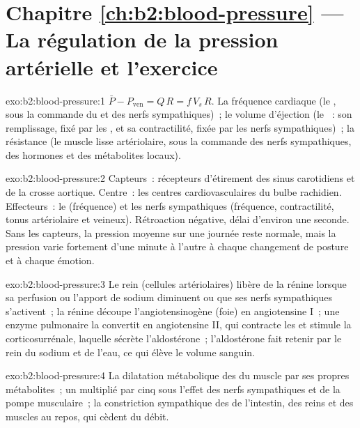 \section*{Chapitre \ref{ch:b2:blood-pressure} --- La régulation de la pression artérielle et l'exercice}

\begin{solution}{exo:b2:blood-pressure:1}
$\bar P - P_{\text{ven}} = Q\,R = f\,V_s\,R$. La fréquence cardiaque (le
, sous la commande du  et des nerfs
sympathiques)~; le volume d'éjection (le ~: son remplissage,
fixé par les , et sa contractilité, fixée par les nerfs
sympathiques)~; la résistance (le muscle lisse artériolaire, sous la
commande des nerfs sympathiques, des hormones et des métabolites
locaux).
\end{solution}

\begin{solution}{exo:b2:blood-pressure:2}
Capteurs~: récepteurs d'étirement des sinus carotidiens et de la crosse
aortique. Centre~: les centres cardiovasculaires du bulbe rachidien.
Effecteurs~: le  (fréquence) et les nerfs sympathiques
(fréquence, contractilité, tonus artériolaire et veineux). Rétroaction
négative, délai d'environ une seconde. Sans les capteurs, la pression
moyenne sur une journée reste normale, mais la pression varie
fortement d'une minute à l'autre à chaque changement de posture et à
chaque émotion.
\end{solution}

\begin{solution}{exo:b2:blood-pressure:3}
Le rein (cellules artériolaires) libère de la rénine lorsque sa
perfusion ou l'apport de sodium diminuent ou que ses nerfs sympathiques
s'activent~; la rénine découpe l'angiotensinogène (foie) en
angiotensine I~; une enzyme pulmonaire la convertit en angiotensine II,
qui contracte les  et stimule la corticosurrénale, laquelle
sécrète l'aldostérone~; l'aldostérone fait retenir par le rein du sodium
et de l'eau, ce qui élève le volume sanguin.
\end{solution}

\begin{solution}{exo:b2:blood-pressure:4}
La dilatation métabolique des  du muscle par ses propres
métabolites~; un  multiplié par cinq sous l'effet des nerfs
sympathiques et de la pompe musculaire~; la constriction sympathique des
 de l'intestin, des reins et des muscles au repos, qui cèdent
du débit.
\end{solution}

